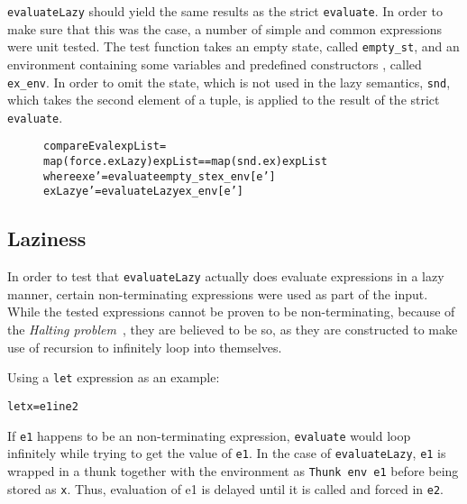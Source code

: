 \texttt{evaluateLazy} should yield the same results as the strict
\texttt{evaluate}. In order to make sure that this was the case, a number of
simple and common expressions were unit tested.
The test function takes an empty state, called \texttt{empty\_st}, and
an environment containing some variables and predefined constructors
, called \texttt{ex\_env}. In order to omit the state, which is not used in
the lazy semantics, \texttt{snd}, which takes the second element of a tuple,
is applied to the result of the strict \texttt{evaluate}.

\begin{figure}[!ht]
\begin{alltt}
  compareEval expList =
    map (force . exLazy) expList == map (snd . ex) expList
      where ex     e' = evaluate empty_st ex_env [e']
            exLazy e' = evaluateLazy ex_env [e']
\end{alltt}
\end{figure}


\subsection{Laziness}
\label{lazinessSem}
In order to test that \texttt{evaluateLazy} actually does evaluate expressions
in a lazy manner, certain non-terminating expressions were used as part of the
input. While the tested expressions cannot be proven to be non-terminating,
because of the \textit{Halting problem}~\cite{haltingproblem}, they are believed
to be so, as they are constructed to make use of recursion to infinitely loop
into themselves.

Using a \texttt{let} expression as an example:
\begin{alltt}
  let x = e1 in e2
\end{alltt}
If \texttt{e1} happens to be an non-terminating expression, \texttt{evaluate}
would loop infinitely while trying to get the value of \texttt{e1}.
In the case of \texttt{evaluateLazy}, \texttt{e1} is wrapped in a thunk
together with the environment as \texttt{Thunk env e1} before being stored
as \texttt{x}. Thus, evaluation of e1 is delayed until it is called and forced
in \texttt{e2}.
